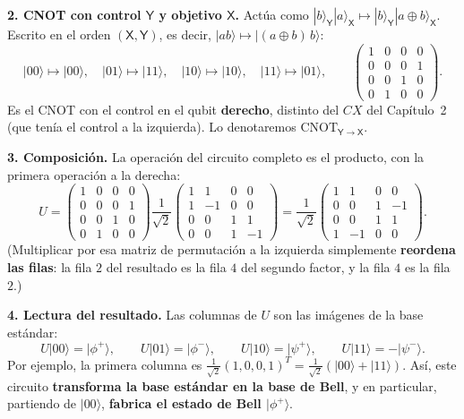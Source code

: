 \documentclass[11pt, a4paper, twoside, openright]{report}
\begin{document}
\noindent \textbf{2. CNOT con control $\mathsf{Y}$ y objetivo $\mathsf{X}$.} Actúa como $|b\rangle_{\mathsf{Y}}|a\rangle_{\mathsf{X}} \mapsto |b\rangle_{\mathsf{Y}}|a\oplus b\rangle_{\mathsf{X}}$. Escrito en el orden $(\mathsf{X},\mathsf{Y})$, es decir, $|ab\rangle\mapsto|(a\oplus b)\,b\rangle$:
\[
|00\rangle\mapsto|00\rangle,\quad |01\rangle\mapsto|11\rangle,\quad |10\rangle\mapsto|10\rangle,\quad |11\rangle\mapsto|01\rangle,
\qquad
\begin{pmatrix} 1&0&0&0\\0&0&0&1\\0&0&1&0\\0&1&0&0\end{pmatrix}.
\]
Es el CNOT con el control en el qubit \textbf{derecho}, distinto del $CX$ del Capítulo~2 (que tenía el control a la izquierda). Lo denotaremos $\mathrm{CNOT}_{\mathsf{Y}\to\mathsf{X}}$.

\noindent \textbf{3. Composición.} La operación del circuito completo es el producto, con la primera operación a la derecha:
\[
U = \begin{pmatrix} 1&0&0&0\\0&0&0&1\\0&0&1&0\\0&1&0&0\end{pmatrix}
\frac{1}{\sqrt2}\begin{pmatrix} 1&1&0&0\\1&-1&0&0\\0&0&1&1\\0&0&1&-1\end{pmatrix}
= \frac{1}{\sqrt2}\begin{pmatrix} 1&1&0&0\\0&0&1&-1\\0&0&1&1\\1&-1&0&0\end{pmatrix}.
\]
(Multiplicar por esa matriz de permutación a la izquierda simplemente \textbf{reordena las filas}: la fila $2$ del resultado es la fila $4$ del segundo factor, y la fila $4$ es la fila $2$.)

\noindent \textbf{4. Lectura del resultado.} Las columnas de $U$ son las imágenes de la base estándar:
\[
U|00\rangle = |\phi^+\rangle, \qquad U|01\rangle = |\phi^-\rangle, \qquad U|10\rangle = |\psi^+\rangle, \qquad U|11\rangle = -|\psi^-\rangle.
\]
Por ejemplo, la primera columna es $\frac{1}{\sqrt2}(1,0,0,1)^T = \frac{1}{\sqrt2}(|00\rangle + |11\rangle)$. Así, este circuito \textbf{transforma la base estándar en la base de Bell}, y en particular, partiendo de $|00\rangle$, \textbf{fabrica el estado de Bell $|\phi^+\rangle$}.
\end{document}
